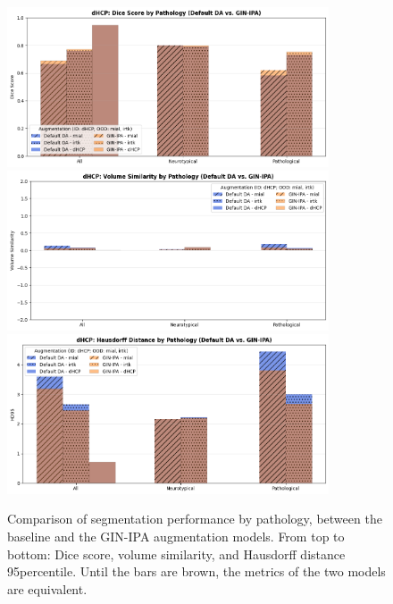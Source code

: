 \begin{figure}[htbp]
  \centering
  \includegraphics[width=0.85\textwidth]{figures/1_pathology_DC.png} \\
  \vspace{10pt}
  \includegraphics[width=0.85\textwidth]{figures/1_pathology_VS.png} \\
  \vspace{10pt}
  \includegraphics[width=0.85\textwidth]{figures/1_pathology_HD.png}
  \caption{Comparison of segmentation performance by pathology, between the baseline and the GIN-IPA augmentation models. From top to bottom: Dice score, volume similarity, and Hausdorff distance 95\th percentile. Until the bars are brown, the metrics of the two models are equivalent.}
  \label{fig:pathology_summary_1}
\end{figure}

